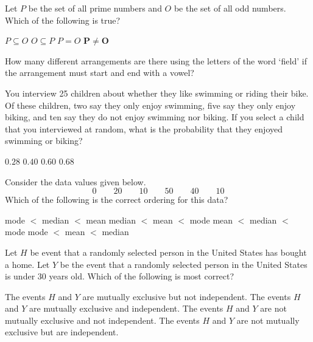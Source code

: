\documentclass[12pt,letterpaper,answers]{exam}
\begin{document}
\begin{questions}
\vfill

\question Let $P$ be the set of all prime numbers and $O$ be the set of all odd numbers. Which of the following is true?
	\begin{choices}
	\choice $P \subseteq O$
	\choice $O \subseteq P$
	\choice $P= O$
	\CorrectChoice $\mathbf{P \neq O}$
	\end{choices}

\vfill

\question How many different arrangements are there using the letters of the word `field' if the arrangement must start and end with a vowel?
	\begin{choices}
	\choice 6
	\CorrectChoice 12
	\choice 60
	\choice 120
	\end{choices}



\newpage
\vfill



\question You interview 25 children about whether they like swimming or riding their bike. Of these children, two say they only enjoy swimming, five say they only enjoy biking, and ten say they do not enjoy swimming nor biking. If you select a child that you interviewed at random, what is the probability that they enjoyed swimming or biking?
	\begin{choices}
	\choice $0.28$
	\choice $0.40$
	\choice $0.60$
	\CorrectChoice $\mathbf{0.68}$
	\end{choices}

\vfill

\question Consider the data values given below.
	\[
	0 \qquad 20 \qquad 10 \qquad 50 \qquad 40 \qquad 10
	\]
Which of the following is the correct ordering for this data?
	\begin{choices}
	\CorrectChoice mode $<$ median $<$ mean
	\choice median $<$ mean $<$ mode
	\choice mean $<$ median $<$ mode
	\choice mode $<$ mean $<$ median
	\end{choices}

\vfill

\question Let $H$ be event that a randomly selected person in the United States has bought a home. Let $Y$ be the event that a randomly selected person in the United States is under 30 years old. Which of the following is most correct?
	\begin{choices}
	\choice The events $H$ and $Y$ are mutually exclusive but not independent. 
	\choice The events $H$ and $Y$ are mutually exclusive and independent. 
	\CorrectChoice The events $H$ and $Y$ are not mutually exclusive and not independent. 
	\choice The events $H$ and $Y$ are not mutually exclusive but are independent. 
	\end{choices}


\end{questions}
\end{document}

